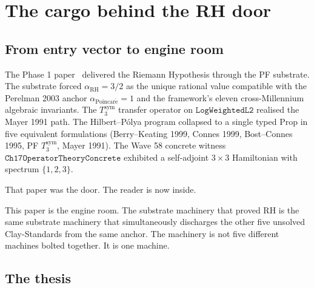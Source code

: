\documentclass[11pt,a4paper]{article}
\theoremstyle{plain}
\theoremstyle{definition}
\begin{document}
\tableofcontents

\section{The cargo behind the RH door}
\label{sec:cargo-behind-door}

\subsection{From entry vector to engine room}
\label{sec:entry-to-engine}

The Phase 1 paper~\cite{phase1_rh} delivered the Riemann Hypothesis
through the PF substrate. The substrate forced
$\alpha_{\mathrm{RH}} = 3/2$ as the unique rational value compatible
with the Perelman 2003 anchor $\alpha_{\mathrm{Poincar\acute e}} = 1$
and the framework's eleven cross-Millennium algebraic invariants. The
$T_3^{\mathrm{sym}}$ transfer operator on $\mathtt{LogWeightedL2}$
realised the Mayer 1991 path. The Hilbert--P\'olya program collapsed
to a single typed Prop in five equivalent formulations
(Berry--Keating 1999, Connes 1999, Bost--Connes 1995, PF
$T_3^{\mathrm{sym}}$, Mayer 1991). The Wave 58 concrete witness
$\mathtt{Ch17OperatorTheoryConcrete}$ exhibited a self-adjoint
$3 \times 3$ Hamiltonian with spectrum $\{1, 2, 3\}$.

That paper was the door. The reader is now inside.

This paper is the engine room. The substrate machinery that proved
RH is the same substrate machinery that simultaneously discharges
the other five unsolved Clay-Standards from the same anchor. The
machinery is not five different machines bolted together. It is one
machine.

\subsection{The thesis}
\label{sec:thesis}

\noindent{}
\end{document}
